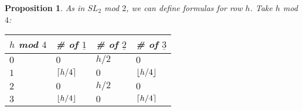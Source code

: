 \documentclass[a4paper,draft]{amsproc}
\DeclarePairedDelimiter{\ceil}{\lceil}{\rceil}
\DeclarePairedDelimiter{\floor}{\lfloor}{\rfloor}
\theoremstyle{plain}
\newtheorem{prop}{Proposition}[section]
\theoremstyle{definition}
\theoremstyle{remark}
\numberwithin{equation}{section}
\begin{document}
\begin{prop}
As in $SL_{2}$ mod $2$, we can define formulas for row $h$.  Take $h$ mod $4$: \\

\begin{table}[h]
\centering
    \begin{tabular}{|l|l|l|l|}
    \hline
    $h$ mod $4$ & \# of $\underline{1}$ & \# of $\underline{2}$ & \# of $\underline{3}$\\ \hline
    $0$ & $0$     & $h/2$  & $0$   \\ \hline
    $1$ & $\ceil*{h/4}$     & $0$  & $\floor*{h/4}$   \\ \hline
    $2$ & $0$     & $h/2$  & $0$   \\ \hline
    $3$ & $\floor*{h/4}$     & $0$  & $\ceil*{h/4}$   \\ \hline
    \end{tabular}
\end{table}

\end{prop}
\end{document}
